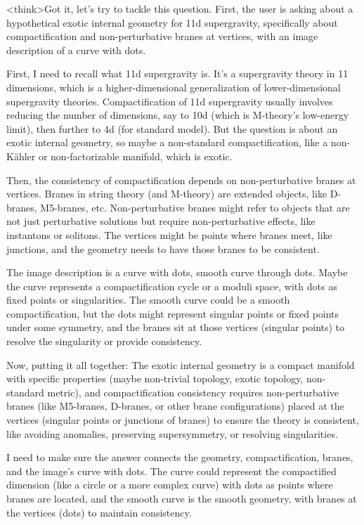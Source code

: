 <think>Got it, let's try to tackle this question. First, the user is asking about a hypothetical exotic internal geometry for 11d supergravity, specifically about compactification and non-perturbative branes at vertices, with an image description of a curve with dots. 

First, I need to recall what 11d supergravity is. It's a supergravity theory in 11 dimensions, which is a higher-dimensional generalization of lower-dimensional supergravity theories. Compactification of 11d supergravity usually involves reducing the number of dimensions, say to 10d (which is M-theory's low-energy limit), then further to 4d (for standard model). But the question is about an exotic internal geometry, so maybe a non-standard compactification, like a non-Kähler or non-factorizable manifold, which is exotic.

Then, the consistency of compactification depends on non-perturbative branes at vertices. Branes in string theory (and M-theory) are extended objects, like D-branes, M5-branes, etc. Non-perturbative branes might refer to objects that are not just perturbative solutions but require non-perturbative effects, like instantons or solitons. The vertices might be points where branes meet, like junctions, and the geometry needs to have those branes to be consistent.

The image description is a curve with dots, smooth curve through dots. Maybe the curve represents a compactification cycle or a moduli space, with dots as fixed points or singularities. The smooth curve could be a smooth compactification, but the dots might represent singular points or fixed points under some symmetry, and the branes sit at those vertices (singular points) to resolve the singularity or provide consistency.

Now, putting it all together: The exotic internal geometry is a compact manifold with specific properties (maybe non-trivial topology, exotic topology, non-standard metric), and compactification consistency requires non-perturbative branes (like M5-branes, D-branes, or other brane configurations) placed at the vertices (singular points or junctions of branes) to ensure the theory is consistent, like avoiding anomalies, preserving supersymmetry, or resolving singularities.

I need to make sure the answer connects the geometry, compactification, branes, and the image's curve with dots. The curve could represent the compactified dimension (like a circle or a more complex curve) with dots as points where branes are located, and the smooth curve is the smooth geometry, with branes at the vertices (dots) to maintain consistency.

